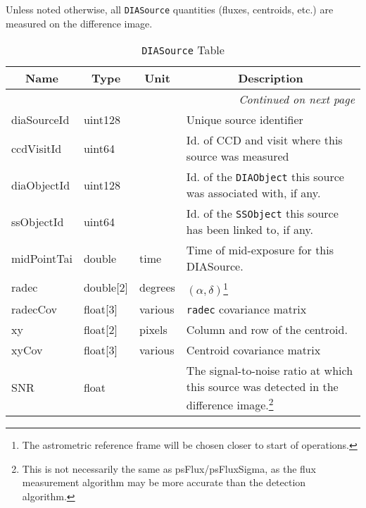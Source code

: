 \documentclass[12pt]{article}
\newcommand{\code}[1]{\texttt{#1}}
\newcommand{\DIASource}{\code{DIASource}\xspace}
\newcommand{\DIAObject}{\code{DIAObject}\xspace}
\newcommand{\SSObject}{\code{SSObject}\xspace}
\begin{document}
Unless noted otherwise, all \DIASource quantities (fluxes, centroids, etc.)
are measured on the difference image.

\begin{center}
\begin{longtable}{p{3cm}p{2cm}p{2cm}p{5cm}}
\caption[\DIASource Table]{\DIASource Table} \\

\hline \multicolumn{1}{c}{\bf Name} & \multicolumn{1}{c}{\bf Type} & \multicolumn{1}{c}{\bf Unit} & \multicolumn{1}{c}{\bf Description} \\ \hline
\endhead

\hline \multicolumn{4}{r}{{\em Continued on next page}} \\
\endfoot

\hline\hline
\endlastfoot

diaSourceId & uint128 & ~ & Unique source identifier \\ 

ccdVisitId & uint64 & ~ & Id. of CCD and visit where this source was measured \\ 

diaObjectId & uint128 & ~ & Id. of the \DIAObject this source was associated
with, if any. \\ 

ssObjectId & uint64 & ~ & Id. of the \SSObject this source has been linked to,
if any. \\ 

midPointTai & double & time & Time of mid-exposure for this DIASource. \\ 

radec & double[2] & degrees & $(\alpha, \delta)$\footnote{The astrometric
reference frame will be chosen closer to start of operations.} \\ 

radecCov & float[3] & various & \texttt{radec} covariance matrix \\ 

xy & float[2] & pixels & Column and row of the centroid. \\ 

xyCov & float[3] & various & Centroid covariance matrix \\ 

SNR & float & ~ & The signal-to-noise ratio at which this source was detected
in the difference image.\footnote{This is not necessarily the same as
psFlux/psFluxSigma, as the flux measurement algorithm may be more accurate
than the detection algorithm.} \\


\end{longtable}
\end{center}
\end{document}
